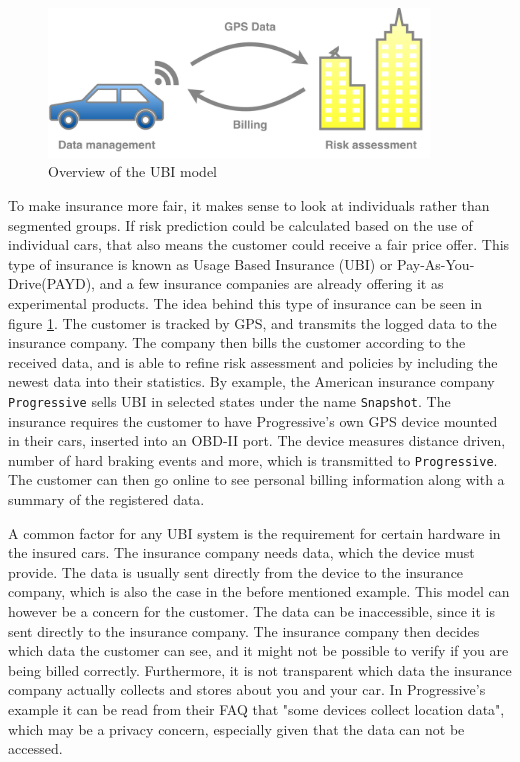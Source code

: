\begin{figure}[tb]
\centering
\includegraphics[width=0.9\textwidth]{Pictures/Overview}
\caption{Overview of the UBI model}
\label{fig:overview}
\end{figure}

To make insurance more fair, it makes sense to look at individuals rather than segmented groups. If risk prediction could be calculated based on the use of individual cars, that also means the customer could receive a fair price offer. This type of insurance is known as Usage Based Insurance (UBI) or Pay-As-You-Drive(PAYD), and a few insurance companies are already offering it as experimental products. The idea behind this type of insurance can be seen in figure \ref{fig:overview}. The customer is tracked by GPS, and transmits the logged data to the insurance company. The company then bills the customer according to the received data, and is able to refine risk assessment and policies by including the newest data into their statistics.
By example, the American insurance company \texttt{Progressive} sells UBI in selected states under the name \texttt{Snapshot}\cite{snapshot}. The insurance requires the customer to have Progressive's own GPS device mounted in their cars, inserted into an OBD-II port. The device measures distance driven, number of hard braking events and more, which is transmitted to \texttt{Progressive}. The customer can then go online to see personal billing information along with a summary of the registered data.

A common factor for any UBI system is the requirement for certain hardware in the insured cars. The insurance company needs data, which the device must provide. The data is usually sent directly from the device to the insurance company, which is also the case in the before mentioned example. This model can however be a concern for the customer. The data can be inaccessible, since it is sent directly to the insurance company. The insurance company then decides which data the customer can see, and it might not be possible to verify if you are being billed correctly. Furthermore, it is not transparent which data the insurance company actually collects and stores about you and your car. In Progressive's example it can be read from their FAQ that "some devices collect location data", which may be a privacy concern, especially given that the data can not be accessed.

